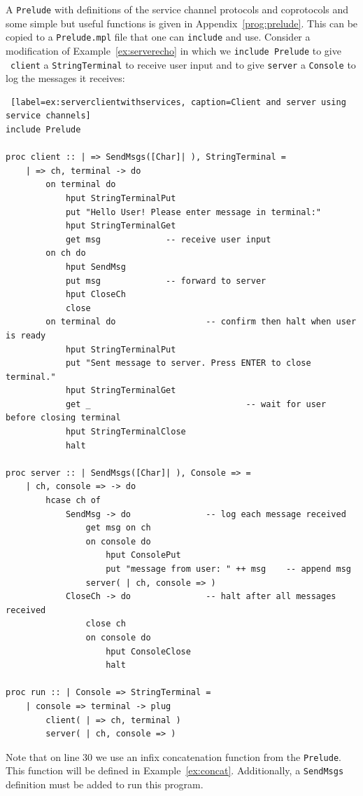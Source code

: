 \documentclass[acmsmall]{acmart}
\begin{document}
A \lstinline{Prelude} with definitions of the service channel protocols and coprotocols and some simple but useful functions is given in Appendix~\ref{prog:prelude}.
This can be copied to a \lstinline{Prelude.mpl} file that one can \lstinline{include} and use.
Consider a modification of Example~\ref{ex:serverecho} in which we \lstinline{include Prelude} to give \ \lstinline$client$ a \lstinline$StringTerminal$ to receive user input and to give \lstinline$server$ a \lstinline$Console$ to log the messages it receives:
\begin{lstlisting} [label=ex:serverclientwithservices, caption=Client and server using service channels]  
include Prelude

proc client :: | => SendMsgs([Char]| ), StringTerminal =
    | => ch, terminal -> do
        on terminal do								
            hput StringTerminalPut
            put "Hello User! Please enter message in terminal:"
            hput StringTerminalGet
            get msg             -- receive user input
        on ch do											
            hput SendMsg
            put msg             -- forward to server
            hput CloseCh
            close
        on terminal do					-- confirm then halt when user is ready
            hput StringTerminalPut
            put "Sent message to server. Press ENTER to close terminal."
            hput StringTerminalGet
            get _								-- wait for user before closing terminal
            hput StringTerminalClose
            halt    
            
proc server :: | SendMsgs([Char]| ), Console => =
    | ch, console => -> do
        hcase ch of
            SendMsg -> do				-- log each message received
                get msg on ch
                on console do
                    hput ConsolePut
                    put "message from user: " ++ msg	-- append msg
                server( | ch, console => )
            CloseCh -> do				-- halt after all messages received
                close ch
                on console do
                    hput ConsoleClose
                    halt
                    
proc run :: | Console => StringTerminal = 
    | console => terminal -> plug
        client( | => ch, terminal )
        server( | ch, console => )
 \end{lstlisting}
Note that on line 30 we use an infix concatenation function from the \lstinline{Prelude}.
This function will be defined in Example~\ref{ex:concat}.
Additionally, a \lstinline{SendMsgs} definition must be added to run this program.
\end{document}
